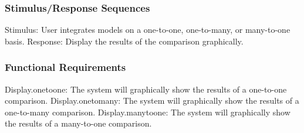 \documentclass{article}
\begin{document}
\subsubsection{Stimulus/Response Sequences}

Stimulus: User integrates models on a one-to-one, one-to-many, or many-to-one basis.
Response: Display the results of the comparison graphically.

\subsubsection{Functional Requirements}

Display.onetoone: The system will graphically show the results of a one-to-one comparison.
Display.onetomany: The system will graphically show the results of a one-to-many comparison.
Display.manytoone: The system will graphically show the results of a many-to-one comparison.
\end{document}
